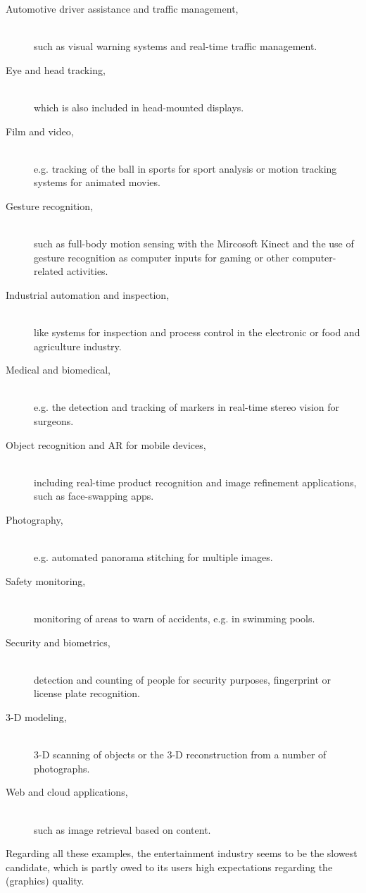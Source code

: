 \begin{description}
\item [Automotive driver assistance and traffic management,]\hfill \\ such as visual warning systems and real-time traffic management.
\item [Eye and head tracking,]\hfill \\ which is also included in head-mounted displays.
\item [Film and video,]\hfill \\ e.g. tracking of the ball in sports for sport analysis or motion tracking systems for animated movies.
\item [Gesture recognition,]\hfill \\ such as full-body motion sensing with the Mircosoft Kinect and the use of gesture recognition as computer inputs for gaming or other computer-related activities.
\item [Industrial automation and inspection,]\hfill \\ like systems for inspection and process control in the electronic or food and agriculture industry. 
\item [Medical and biomedical,]\hfill \\ e.g. the detection and tracking of markers in real-time stereo vision for surgeons.
\item [Object recognition and AR for mobile devices,]\hfill \\ including real-time product recognition and image refinement applications, such as face-swapping apps.
\item [Photography,]\hfill \\ e.g. automated panorama stitching for multiple images.
\item [Safety monitoring,]\hfill \\ monitoring of areas to warn of accidents, e.g. in swimming pools.
\item [Security and biometrics,]\hfill \\ detection and counting of people for security purposes, fingerprint or license plate recognition.
\item [3-D modeling,]\hfill \\ 3-D scanning of objects or the 3-D reconstruction from a number of photographs. 
\item [Web and cloud applications,]\hfill \\ such as image retrieval based on content. 
\end{description}

Regarding all these examples, the entertainment industry seems to be the slowest candidate, which is partly owed to its users high expectations regarding the (graphics) quality. 

